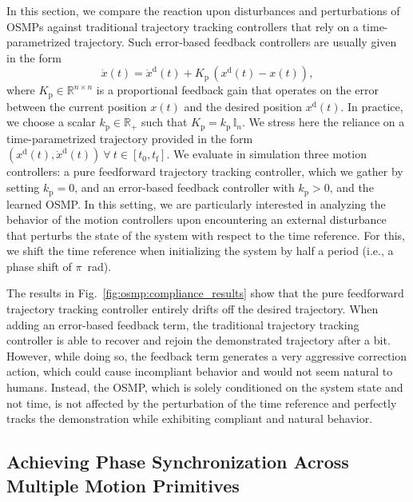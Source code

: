 In this section, we compare the reaction upon disturbances and perturbations of \glspl{OSMP} against traditional trajectory tracking controllers that rely on a time-parametrized trajectory.
Such error-based feedback controllers are usually given in the form
\begin{equation}\label{eq:osmp:trajectory_tracking_controller}
    \dot{x}(t) = \dot{x}^\mathrm{d}(t) + K_\mathrm{p} \, (x^\mathrm{d}(t) - x(t)),
\end{equation}
where $K_\mathrm{p} \in \mathbb{R}^{n \times n}$ is a proportional feedback gain that operates on the error between the current position $x(t)$ and the desired position $x^\mathrm{d}(t)$. In practice, we choose a scalar $k_\mathrm{p} \in \mathbb{R}_+$ such that $K_\mathrm{p} = k_\mathrm{p} \, \mathbb{I}_{n}$. We stress here the reliance on a time-parametrized trajectory provided in the form $(x^\mathrm{d}(t),\dot{x}^\mathrm{d}(t)) \: \forall \: t \in [t_0, t_\mathrm{f}]$. 
We evaluate in simulation three motion controllers: a pure feedforward trajectory tracking controller, which we gather by setting $k_\mathrm{p} = 0$, and an error-based feedback controller with $k_\mathrm{p} > 0$, and the learned \gls{OSMP}.
In this setting, we are particularly interested in analyzing the behavior of the motion controllers upon encountering an external disturbance that perturbs the state of the system with respect to the time reference. For this, we shift the time reference when initializing the system by half a period (i.e., a phase shift of $\pi$~rad).

The results in Fig.~\ref{fig:osmp:compliance_results} show that the pure feedforward trajectory tracking controller entirely drifts off the desired trajectory. When adding an error-based feedback term, the traditional trajectory tracking controller is able to recover and rejoin the demonstrated trajectory after a bit. However, while doing so, the feedback term generates a very aggressive correction action, which could cause incompliant behavior and would not seem natural to humans. Instead, the \gls{OSMP}, which is solely conditioned on the system state and not time, is not affected by the perturbation of the time reference and perfectly tracks the demonstration while exhibiting compliant and natural behavior.


\subsection{Achieving Phase Synchronization Across Multiple Motion Primitives}

